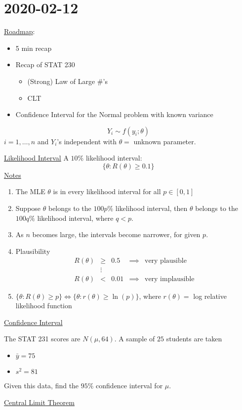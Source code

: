 \section{2020-02-12}
\underline{Roadmap}:
\begin{itemize}
    \item 5 min recap
    \item Recap of STAT 230
          \begin{itemize}
              \item (Strong) Law of Large \#'s
              \item CLT
          \end{itemize}
    \item Confidence Interval for the Normal problem with known variance
\end{itemize}
\[ Y_i \sim f(y_i;\theta) \]
$ i=1,\ldots ,n $ and $ Y_i $'s independent with $ \theta= $ unknown parameter.

\underline{Likelihood Interval}
A $ 10\% $ likelihood interval:
\[ \{\theta:R(\theta)\geqslant 0.1\} \]
\underline{Notes}
\begin{enumerate}[label=(\roman*)]
    \item The MLE $ \theta $ is in every likelihood interval for all $ p\in[0,1] $
    \item Suppose $ \theta $ belongs to the $ 100p\% $ likelihood interval, then
          $ \theta $ belongs to the $ 100q\% $ likelihood interval, where $ q<p $.
    \item As $ n $ becomes large, the intervals become narrower, for given $ p $.
    \item Plausibility
          \[
              \begin{array}{ccccc}
                  R(\theta) & \geqslant & 0.5  & \implies & \text{very plausible}   \\
                            & \vdots    &                                           \\
                  R(\theta) & <         & 0.01 & \implies & \text{very implausible}
              \end{array}
          \]
    \item $ \{\theta:R(\theta)\geqslant p\}\iff \{\theta:r(\theta)\geqslant \ln(p)\} $,
          where $ r(\theta) = $ log relative likelihood function
\end{enumerate}
\underline{Confidence Interval}
\begin{exbox}
    \begin{example}
        The STAT 231 scores are $ N(\mu,64) $. A sample of $ 25 $ students are
        taken
        \begin{itemize}
            \item $ \bar{y}=75 $
            \item $ s^2=81 $
        \end{itemize}
        Given this data, find the $ 95\% $ confidence interval for $ \mu $.
    \end{example}
\end{exbox}
\underline{Central Limit Theorem}


